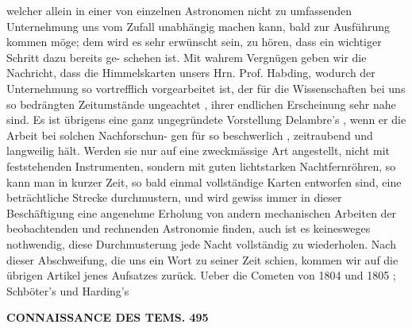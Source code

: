 \documentclass[12pt,a4paper]{article}
\begin{document}
welcher  allein  in  einer  von  einzelnen  Astronomen nicht  zu  umfassenden  Unternehmung  uns  vom  Zufall  unabhängig  machen  kann,  bald  zur  Ausführung kommen  möge;  dem  wird  es  sehr  erwünscht  sein,  zu  hören,  dass  ein  wichtiger  Schritt  dazu  bereits  ge- schehen ist.  Mit  wahrem  Vergnügen  geben  wir  die  Nachricht,  dass  die  Himmelskarten  unsers  Hrn. Prof.  Habding,  wodurch  der  Unternehmung  so  vortrefflich  vorgearbeitet  ist,  der  für  die  Wissenschaften bei  uns  so  bedrängten  Zeitumstände  ungeachtet ,  ihrer  endlichen  Erscheinung  sehr  nahe  sind.  Es  ist übrigens  eine  ganz  ungegründete  Vorstellung  Delambre's  ,  wenn  er  die  Arbeit  bei  solchen  Nachforschun- gen für  so  beschwerlich ,  zeitraubend  und  langweilig  hält.  Werden  sie  nur  auf  eine  zweckmässige  Art angestellt,  nicht  mit  feststehenden  Instrumenten,  sondern  mit  guten  lichtstarken  Nachtfernröhren,  so kann  man  in  kurzer  Zeit,  so  bald  einmal  vollständige  Karten  entworfen  sind,  eine  beträchtliche  Strecke durchmustern,  und  wird  gewiss  immer  in  dieser  Beschäftigung  eine  angenehme  Erholung  von  andern mechanischen  Arbeiten  der  beobachtenden  und  rechnenden  Astronomie  finden,  auch  ist  es  keinesweges nothwendig,  diese  Durchmusterung  jede  Nacht  vollständig  zu  wiederholen. Nach  dieser  Abschweifung,  die  uns  ein  Wort  zu  seiner  Zeit  schien,  kommen  wir  auf  die  übrigen Artikel  jenes  Aufsatzes    zurück.      Ueber   die   Cometen   von    1804    und   1805 ;    Schböter's    und    Harding's

\vspace{0.5em}


\noindent\textbf{CONNAISSANCE  DES  TEMS.  495}
\end{document}
